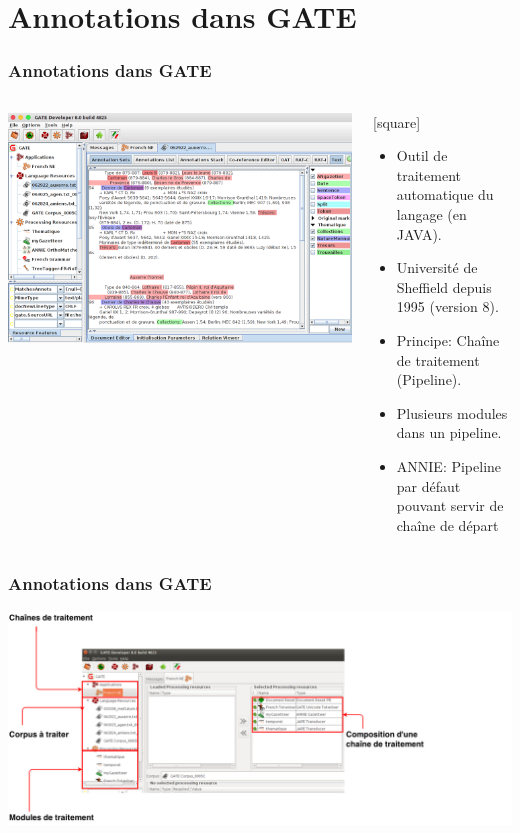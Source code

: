 \documentclass[10pt, compress]{beamer}
\begin{document}
\section{Annotations dans GATE}
\begin{frame}[fragile]
\frametitle{Annotations dans GATE}
\begin{columns}
	\begin{center}
	\includegraphics[scale=0.190]{img/gate.png} 
	\end{center}
	\begin{scriptsize}
		[square]
	\begin{itemize}
		\item{Outil de traitement automatique du langage (en JAVA).}
		\item{Université de Sheffield depuis 1995 (version 8).}
		\item{Principe: Chaîne de traitement (Pipeline).}
		\item{Plusieurs modules dans un pipeline.}
		\item{ANNIE: Pipeline par défaut pouvant servir de chaîne de départ}
	\end{itemize}
	\end{scriptsize}
\end{columns}
\end{frame}

\begin{frame}[fragile]
\frametitle{Annotations dans GATE}
	\begin{center}
	\includegraphics[scale=0.275]{img/gatePresent.png} 
	\end{center}
\end{frame}
\end{document}
